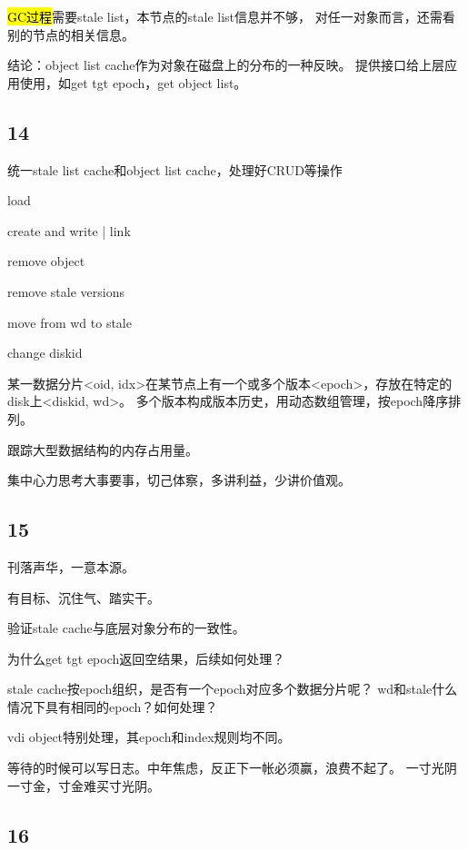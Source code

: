 \hl{GC过程}需要stale list，本节点的stale list信息并不够，
对任一对象而言，还需看别的节点的相关信息。

结论：object list cache作为对象在磁盘上的分布的一种反映。
提供接口给上层应用使用，如get tgt epoch，get object list。

\subsection{14}

统一stale list cache和object list cache，处理好CRUD等操作
\begin{enumbox}
\item load
\item create and write | link
\item remove object
\item remove stale versions
\item move from wd to stale
\item change diskid
\end{enumbox}

某一数据分片<oid, idx>在某节点上有一个或多个版本<epoch>，存放在特定的disk上<diskid, wd>。
多个版本构成版本历史，用动态数组管理，按epoch降序排列。

跟踪大型数据结构的内存占用量。

\hrulefill

集中心力思考大事要事，切己体察，多讲利益，少讲价值观。

\subsection{15}

刊落声华，一意本源。

有目标、沉住气、踏实干。

验证stale cache与底层对象分布的一致性。

为什么get tgt epoch返回空结果，后续如何处理？

stale cache按epoch组织，是否有一个epoch对应多个数据分片呢？
wd和stale什么情况下具有相同的epoch？如何处理？

vdi object特别处理，其epoch和index规则均不同。

等待的时候可以写日志。中年焦虑，反正下一帐必须赢，浪费不起了。
一寸光阴一寸金，寸金难买寸光阴。

\subsection{16}

